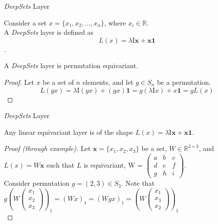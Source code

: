 \documentclass{beamer}
\begin{document}
\begin{frame}{\emph{DeepSets} Layer}

    \begin{definition}
        Consider a set $x = \{x_1, x_2, \ldots, x_n\}$, where $x_i \in \mathbb{R}$.\\
        A \emph{DeepSets} layer is defined as 
        \[L(x) = \lambda\mathrm{I}\mathbf{x} + \mathbf{x}\mathbf{1}\].
    \end{definition}

    \begin{theorem}
        A \emph{DeepSets} layer is permutation equivariant.
    \end{theorem}

    \begin{proof}
        Let $x$ be a set of $n$ elements, and let $g \in S_n$ be a permutation.
        \[ L(gx) = \lambda\mathrm{I}(gx) + (gx)\mathbf{1} = g(\lambda\mathrm{I}x) + x\mathbf{1} = gL(x)\]
    \end{proof}
\end{frame}
\begin{frame}{\emph{DeepSets} Layer}
    \begin{theorem}
        Any linear equivariant layer is of the shape \(L(x) = \lambda\mathrm{I}\mathbf{x} + \mathbf{x}\mathbf{1}\).
    \end{theorem}

    \renewcommand{\qedsymbol}{}
    \begin{proof}[Proof (through example)]
        Let $\mathbf{x}=\{x_1,x_2,x_3\}$ be a set, $W \in \mathbb{R}^{3 \times 3}$, and $L(x) = W\mathbf{x}$ such that $L$ is equivariant, W = $\begin{pmatrix}
            a & b & c\\
            d & e & f\\
            g & h & i
        \end{pmatrix}$.\\
        Consider permutation $g=(2,3) \in S_3$. Note that $g\left(W\begin{pmatrix}
            x_1\\
            x_2\\
            x_3
        \end{pmatrix}\right)_1=(Wx)_1 = (Wgx)_1 = \left(W\begin{pmatrix}
            x_1\\
            x_3\\
            x_2
        \end{pmatrix}\right)_1$\\
    \end{proof}
    \renewcommand{\qedsymbol}{\ensuremath{\square}} 
\end{frame}
\end{document}

